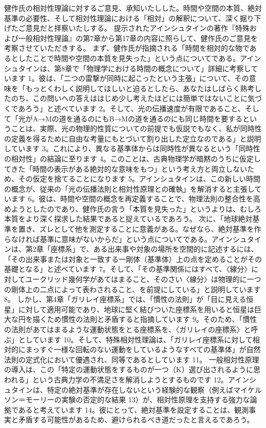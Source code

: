 \documentclass{article}
\begin{document}
健作氏の相対性理論に対するご意見、承知いたしした。時間や空間の本質、絶対基準の必要性、そして相対性理論における「相対」の解釈について、深く掘り下げたご意見だと拝察いたしする。
提示されたアインシュタインの著作『特殊および一般相対性理論』の第7章から第17章の内容に照らして、健作氏のご意見を考察させていただきする。
まず、健作氏が指摘される「時間を相対的な物であるとしたことで時間や空間の本質を見失った」という点についてである。アインシュタインは、第8章で「物理学における時間の概念について」詳細に考察しています 1。彼は、「二つの雷撃が同時に起こったという主張」について、その意味を「もっとくわしく説明してほしいと迫るとしたら、あなたはしばらく熟考したのち、この問いへの答えははじめ少し考えたほどには簡単ではないことに気づくであろう」と述べています 2。そして、光の伝播速度が有限であること、そして「光がA→Mの道を通るのにもB→Mの道を通るのにも同じ時間を要するということは、実際、光の物理的性質についての前提でも仮説でもなく、私が同時性の定義を得るために自由な考量にもとづいて割り出した定立なのである」と説明しています 3。これにより、異なる基準体からは同時性が異なるという「同時性の相対性」の結論に至ります 4。このことは、古典物理学が暗黙のうちに仮定してきた「時間の表示がある絶対的な意味をもつ」という考え方と両立しないため、その仮定を捨てることになります 5。アインシュタインは、この新しい時間の概念が、従来の「光の伝播法則と相対性原理との確執」を解消すると主張しています 6。彼は、時間や空間の概念を再定義することで、物理法則の整合性を高めようとしたのであり、健作氏の言う「本質を見失った」というよりは、むしろ本質をより深く探求した結果であると捉えているであろう。
次に、「地球絶対基準を置き、ズレとして他を測定することに意義がある。なぜなら、絶対基準を作らなければ基準に意味がないからだ」という点についてである。アインシュタインは、第2章「座標系」で、ある出来事や対象の場所を空間的に記述するには、「その出来事または対象と一致する一剛体（基準体）上の点を定めることがその基礎となる」と述べています 7。そして、「その基準関係にはすべて、〈線分〉に対してユークリッド幾何学があてはまること、そのさい〈線分〉は物理的に一つの剛体上の二点によって表わされること、を前提にしている」と説明しています 8。
しかし、第4章「ガリレイ座標系」では、「慣性の法則」が「目に見える恒星」に対して適用可能であり、地球に堅く結びついた座標系を用いると恒星は巨大な円を描くため慣性の法則と矛盾すると指摘しています 9。そのため、「慣性の法則があてはまるような運動状態をとる座標系を、〈ガリレイの座標系〉と呼ぶ」としています 10。そして、特殊相対性理論は、「ガリレイ座標系に対して相対的にまっすぐ一様な回転のない運動をしているようなすべての基準体」が自然法則の定式化において優遇され、同等であるとしています 11。
一般相対性原理の導入は、この「特定の運動状態をするものが一つ（K）選び出されるように思われる」という古典力学の不満足さを解消しようとするものです 12。アインシュタインは、特定の絶対基準が存在しないという経験的な観察（例えばマイケルソン＝モーリーの実験の否定的な結果 13）が、相対性原理を支持する強力な論拠であると考えています 14。彼にとって、絶対基準を設定することは、観測事実と矛盾する可能性があるため、避けられるべき道だったと言えるであろう。
\end{document}
